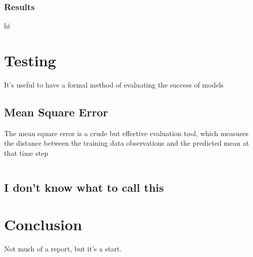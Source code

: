 \documentclass[a4paper,11pt]{report}
\begin{document}
\subsection{Results}
hi



\chapter{Testing}
It's useful to have a formal method of evaluating the success of models

\section{Mean Square Error}
The mean square error is a crude but effective evaluation tool, which measures the distance between the training data observations and the predicted mean at that time step

\begin{equation}

\end{equation}

\section{I don't know what to call this}

\chapter{Conclusion}
Not much of a report, but it's a start.

\singlespacing 



\end{document}
